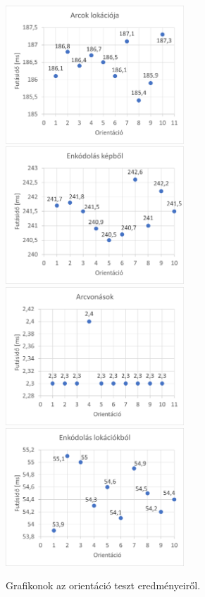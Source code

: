 \begin{figure}[!ht]
	\centering
	\includegraphics[width=67mm, keepaspectratio]{03_images/graph2/orientacio.png}\hspace{1cm}
	\includegraphics[width=67mm, keepaspectratio]{03_images/graph2/orientacio2.png}\\\vspace{5mm}
	\includegraphics[width=67mm, keepaspectratio]{03_images/graph2/orientacio3.png}\hspace{1cm}
	\includegraphics[width=67mm, keepaspectratio]{03_images/graph2/orientacio4.png}
	\caption{Grafikonok az orientáció teszt eredményeiről.}
	\label{fig:ori_graphs}
\end{figure}